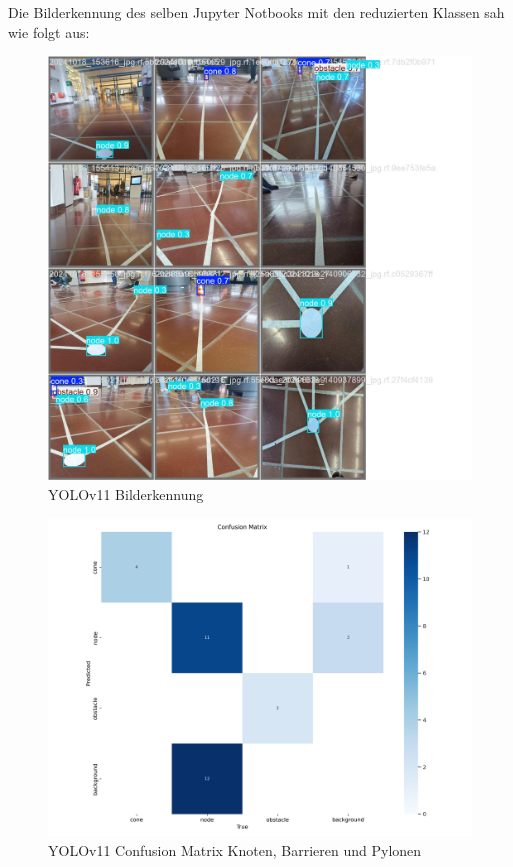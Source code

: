 Die Bilderkennung des selben Jupyter Notbooks mit den reduzierten Klassen sah wie folgt aus:

\begin{figure}[H]
\centering
\includegraphics[width=\textwidth -30mm]{assets/informatik-prototyp/yolo/recognized-images.jpeg}
\caption{YOLOv11 Bilderkennung}
\label{fig:img-recognition-yolo}
\end{figure}

\begin{figure}[H]
\centering
\includegraphics[width=\textwidth -20mm]{assets/informatik-prototyp/yolo/conf-matrix.png}
\caption{YOLOv11 Confusion Matrix Knoten, Barrieren und Pylonen}
\label{fig:conf-matrix-yolo}
\end{figure}

